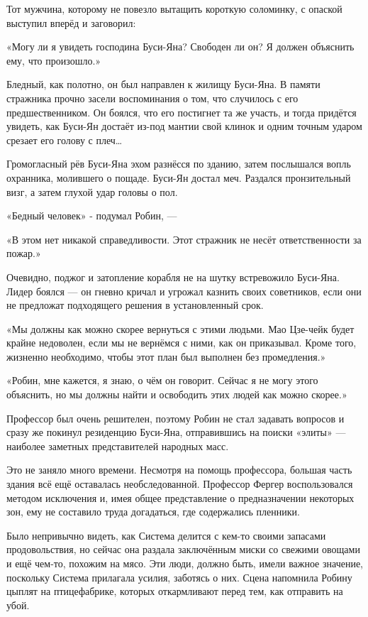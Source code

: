 \documentclass[a5paper, 9pt,
final, openany, twoside=true]{memoir}
\begin{document}
Тот мужчина, которому не повезло вытащить короткую соломинку, с опаской выступил вперёд и заговорил:

«Могу ли я увидеть господина Буси-Яна? Свободен ли он? Я должен объяснить ему, что произошло.»

Бледный, как полотно, он был направлен к жилищу Буси-Яна. В памяти стражника прочно засели воспоминания о том, что случилось с его предшественником. Он боялся, что его постигнет та же участь, и тогда придётся увидеть, как Буси-Ян достаёт из-под мантии свой клинок и одним точным ударом срезает его голову с плеч…\bigskip

Громогласный рёв Буси-Яна эхом разнёсся по зданию, затем послышался вопль охранника, молившего о пощаде. Буси-Ян достал меч. Раздался пронзительный визг, а затем глухой удар головы о пол.\bigskip

«Бедный человек» - подумал Робин, —

«В этом нет никакой справедливости. Этот стражник не несёт ответственности за пожар.»\bigskip

Очевидно, поджог и затопление корабля не на шутку встревожило Буси-Яна. Лидер боялся — он гневно кричал и угрожал казнить своих советников, если они не предложат подходящего решения в установленный срок.

«Мы должны как можно скорее вернуться с этими людьми. Мао Цзе-чейк будет крайне недоволен, если мы не вернёмся с ними, как он приказывал. Кроме того, жизненно необходимо, чтобы этот план был выполнен без промедления.»\bigskip

«Робин, мне кажется, я знаю, о чём он говорит. Сейчас я не могу этого объяснить, но мы должны найти и освободить этих людей как можно скорее.»

Профессор был очень решителен, поэтому Робин не стал задавать вопросов и сразу же покинул резиденцию Буси-Яна, отправившись на поиски «элиты» — наиболее заметных представителей народных масс.

Это не заняло много времени. Несмотря на помощь профессора, большая часть здания всё ещё оставалась необследованной. Профессор Фергер воспользовался методом исключения и, имея общее представление о предназначении некоторых зон, ему не составило труда догадаться, где содержались пленники.

Было непривычно видеть, как Система делится с кем-то своими запасами продовольствия, но сейчас она раздала заключённым миски со свежими овощами и ещё чем-то, похожим на мясо. Эти люди, должно быть, имели важное значение, поскольку Система прилагала усилия, заботясь о них. Сцена напомнила Робину цыплят на птицефабрике, которых откармливают перед тем, как отправить на убой.
\end{document}
